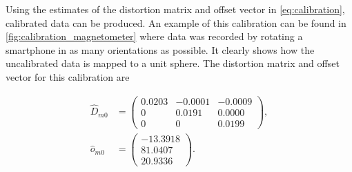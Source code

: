 Using the estimates of the distortion matrix and offset vector in \eqref{eq:calibration}, calibrated data can be produced. An example of this calibration can be found in \cref{fig:calibration_magnetometer} where data was recorded by rotating a smartphone in as many orientations as possible. It clearly shows how the uncalibrated data is mapped to a unit sphere. The distortion matrix and offset vector for this calibration are 

\begin{subequations}
	\begin{align}
		\widehat{D}_{m0} &= \left(\begin{array}{rrr}
			0.0203 & -0.0001 & -0.0009 \\
			0 & 0.0191 & 0.0000 \\
			0 & 0 & 0.0199
		\end{array}\right), \\
		\widehat{o}_{m0} &= \left(\begin{array}{r}
			-13.3918 \\
			81.0407 \\
			20.9336
		\end{array}\right).
	\end{align}
	
\end{subequations}

